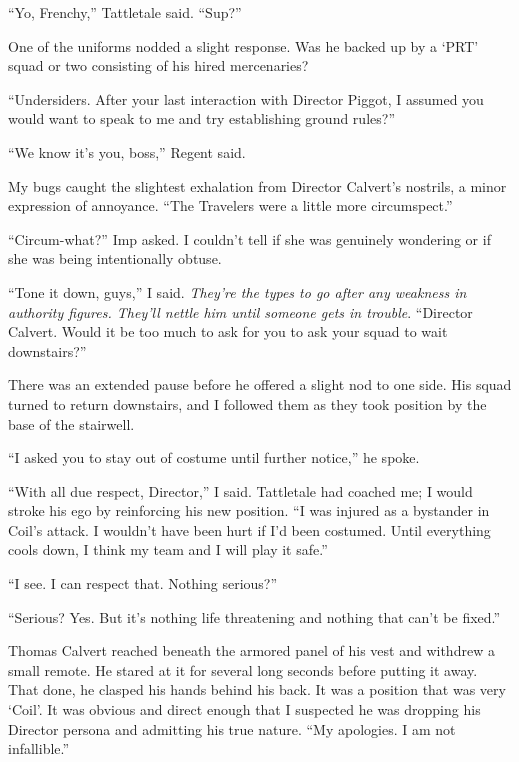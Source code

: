 ``Yo, Frenchy,'' Tattletale said.  ``Sup?''



One of the uniforms nodded a slight response.  Was he backed up by a `PRT' squad or two consisting of his hired mercenaries?



``Undersiders.  After your last interaction with Director Piggot, I assumed you would want to speak to me and try establishing ground rules?''



``We know it's you, boss,'' Regent said.



My bugs caught the slightest exhalation from Director Calvert's nostrils, a minor expression of annoyance.  ``The Travelers were a little more circumspect.''



``Circum-what?'' Imp asked.  I couldn't tell if she was genuinely wondering or if she was being intentionally obtuse.



``Tone it down, guys,'' I said.  \emph{They're the types to go after any weakness in authority figures.  They'll nettle him until someone gets in trouble}. ``Director Calvert.  Would it be too much to ask for you to ask your squad to wait downstairs?''



There was an extended pause before he offered a slight nod to one side.  His squad turned to return downstairs, and I followed them as they took position by the base of the stairwell.



``I asked you to stay out of costume until further notice,'' he spoke.



``With all due respect, Director,'' I said.  Tattletale had coached me; I would stroke his ego by reinforcing his new position.  ``I was injured as a bystander in Coil's attack.  I wouldn't have been hurt if I'd been costumed.  Until everything cools down, I think my team and I will play it safe.''



``I see.  I can respect that.  Nothing serious?''



``Serious?  Yes.  But it's nothing life threatening and nothing that can't be fixed.''



Thomas Calvert reached beneath the armored panel of his vest and withdrew a small remote.  He stared at it for several long seconds before putting it away.  That done, he clasped his hands behind his back.  It was a position that was very `Coil'.  It was obvious and direct enough that I suspected he was dropping his Director persona and admitting his true nature.  ``My apologies.  I am not infallible.''



